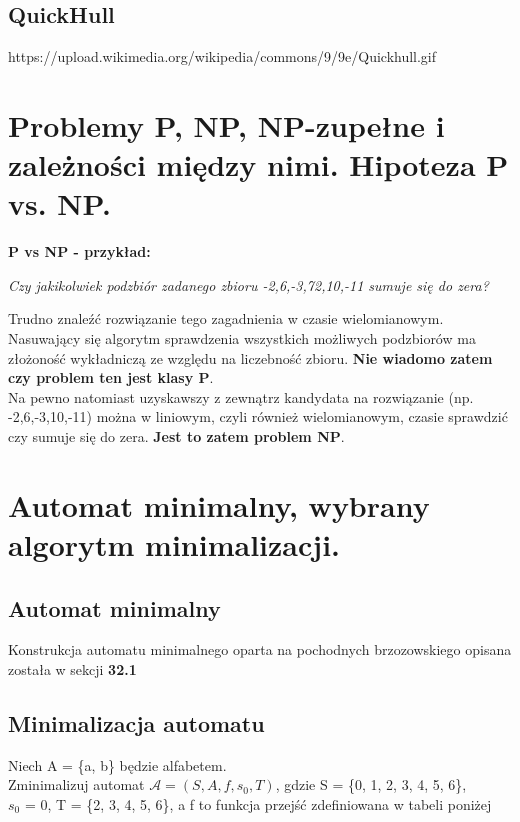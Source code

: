 \documentclass[12pt]{article}
\begin{document}
    \subsection{QuickHull}

    https://upload.wikimedia.org/wikipedia/commons/9/9e/Quickhull.gif

    \newpage

    \section{Problemy P, NP, NP-zupełne i zależności między nimi. Hipoteza P vs. NP.}

    \textbf{P vs NP - przykład:}

    \begin{center}
        \textit{Czy jakikolwiek podzbiór zadanego zbioru {-2,6,-3,72,10,-11} sumuje się do zera?}
    \end{center}

    \noindent Trudno znaleźć rozwiązanie tego zagadnienia w czasie wielomianowym. Nasuwający się algorytm sprawdzenia wszystkich
    możliwych podzbiorów ma złożoność wykładniczą ze względu na liczebność zbioru. \textbf{Nie wiadomo zatem czy problem ten
    jest klasy P}.\\

    \noindent Na pewno natomiast uzyskawszy z zewnątrz kandydata na rozwiązanie (np. {-2,6,-3,10,-11}) można w
    liniowym, czyli również wielomianowym, czasie sprawdzić czy sumuje się do zera. \textbf{Jest to zatem problem NP}.


    \newpage

    \section{Automat minimalny, wybrany algorytm minimalizacji.}
	\subsection{Automat minimalny}
	Konstrukcja automatu minimalnego oparta na pochodnych brzozowskiego opisana została w sekcji \textbf{32.1}

	\subsection{Minimalizacja automatu}
	\begin{exercise}
	Niech A = \{a, b\} będzie alfabetem. \\
	Zminimalizuj automat $\mathcal{A} = (S, A, f, s_0, T)$, gdzie S = \{0, 1, 2, 3, 4, 5, 6\}, \\
	$s_0$ = 0, T = \{2, 3, 4, 5, 6\}, a f to funkcja przejść zdefiniowana w tabeli poniżej
	\end{exercise}
\end{document}
